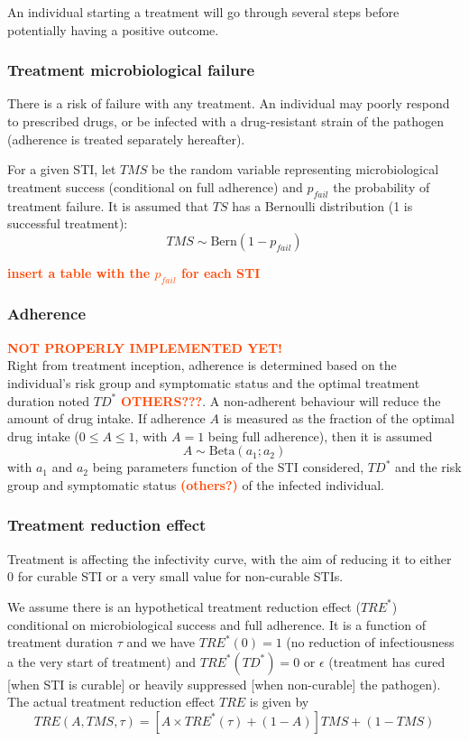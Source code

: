 \documentclass[11pt, onecolumn]{article}
\newcommand{\warning}[1]{\textbf{\textcolor{OrangeRed}{#1}}}
\begin{document}
An individual starting a treatment will go through several steps before potentially having a positive outcome. 

\subsubsection{Treatment microbiological failure}

There is a risk of failure with any treatment. An individual may poorly respond to prescribed drugs, or be infected with a drug-resistant strain of the pathogen (adherence is treated separately hereafter).

For a given STI, let $TMS$ be the random variable representing microbiological treatment success (conditional on full adherence) and $p_{fail}$ the probability of treatment failure. It is assumed that $TS$ has a Bernoulli distribution (1 is successful treatment):
$$TMS \sim \mathrm{Bern}(1- p_{fail})$$

\warning{insert a table with the $p_{fail}$ for each STI}

\subsubsection{Adherence}
\warning{NOT PROPERLY IMPLEMENTED YET!}\\
Right from treatment inception, adherence is determined based on the individual's risk group and symptomatic status and the optimal treatment duration noted $TD^*$ \warning{OTHERS???}. A non-adherent behaviour will reduce the amount of drug intake. If adherence $A$ is measured as the fraction of the optimal drug intake ($0 \leq A\leq 1$, with $A=1$ being full adherence), then it is assumed
$$ A \sim \mathrm{Beta}(a_1; a_2)$$
with $a_1$ and $a_2$ being parameters function of the STI considered, $TD^*$ and the risk group and symptomatic status \warning{(others?)} of the infected individual.


\subsubsection{Treatment reduction effect}

Treatment is affecting the infectivity curve, with the aim of reducing it to either 0 for curable STI or a very small value for non-curable STIs. 

We assume there is an hypothetical treatment reduction effect ($TRE^*$) conditional on microbiological success and full adherence. It is a function of treatment duration $\tau$ and we have $TRE^*(0)=1$ (no reduction of infectiousness a the very start of treatment) and $TRE^*(TD^*)=0$ or $\epsilon$ (treatment has cured [when STI is curable] or heavily suppressed [when non-curable] the pathogen). The actual treatment reduction effect $TRE$ is given by
$$TRE(A, TMS,\tau) = \left[A\times TRE^*(\tau) + (1-A) \right] TMS + (1-TMS) $$
\end{document}
